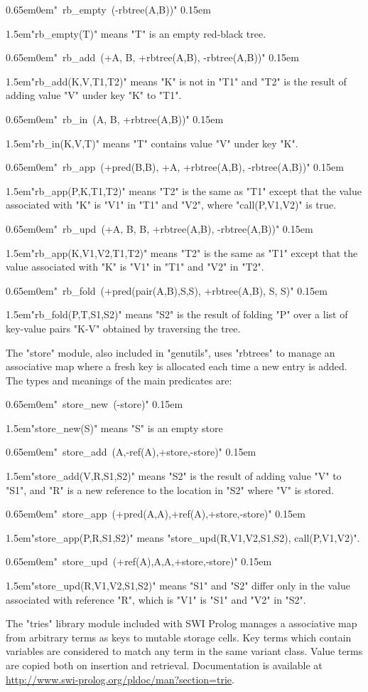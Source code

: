 {\parindent 0pt
\def\dt{\parskip 0.65em\leftskip 0em}
\def\dd{\parskip 0.15em \par\leftskip 1.5em}

  \dt "~rb_empty~(-rbtree(A,B))" 
  \dd "rb_empty(T)" means "T" is an empty red-black tree.

  \dt "~rb_add~(+A, B, +rbtree(A,B), -rbtree(A,B))"
  \dd "rb_add(K,V,T1,T2)" means "K" is not in "T1" and "T2"  is the result of
      adding value "V" under key "K" to "T1".

  \dt "~rb_in~(A, B, +rbtree(A,B))"
  \dd "rb_in(K,V,T)" means "T" contains value "V" under key "K".

  \dt "~rb_app~(+pred(B,B), +A, +rbtree(A,B), -rbtree(A,B))"
  \dd "rb_app(P,K,T1,T2)" means "T2" is the same as "T1" except that the value
      associated with "K" is "V1" in "T1" and "V2", where "call(P,V1,V2)" is true.

  \dt "~rb_upd~(+A, B, B, +rbtree(A,B), -rbtree(A,B))"
  \dd "rb_app(K,V1,V2,T1,T2)" means "T2" is the same as "T1" except that the
      value associated with "K" is "V1" in "T1" and "V2" in "T2".

  \dt "~rb_fold~(+pred(pair(A,B),S,S), +rbtree(A,B), S, S)"
  \dd "rb_fold(P,T,S1,S2)" means "S2" is the result of folding "P" over a list of key-value
      pairs "K-V" obtained by traversing the tree.

}
\vspace{0.5em}
\noindent
The "store" module, also included in "genutils", uses "rbtrees" to manage an associative map where 
a fresh key is allocated each time a new entry is added. The types and meanings of the main predicates
are:
{\parindent 0pt
\def\dt{\parskip 0.65em\leftskip 0em}
\def\dd{\parskip 0.15em \par\leftskip 1.5em}

  \dt "~store_new~(-store)" 
  \dd {"store_new(S)"} means {"S"} is an empty store

  \dt "~store_add~(A,-ref(A),+store,-store)" 
  \dd "store_add(V,R,S1,S2)" means "S2" is the result of adding value "V" to "S1", and "R" is a new
  reference to the location in "S2" where "V" is stored.

  \dt "~store_app~(+pred(A,A),+ref(A),+store,-store)"
  \dd "store_app(P,R,S1,S2)" means "store_upd(R,V1,V2,S1,S2), call(P,V1,V2)".

  \dt "~store_upd~(+ref(A),A,A,+store,-store)"
  \dd "store_upd(R,V1,V2,S1,S2)" means "S1" and "S2" differ only in the value associated with reference "R",
  which is "V1" is "S1" and "V2" in "S2".

}
\vspace{0.5em}
\noindent
The "tries" library module included with SWI Prolog manages a associative map from arbitrary
terms as keys to mutable storage cells. Key terms which contain variables are considered
to match any term in the same variant class. Value terms are copied both on insertion and
retrieval. Documentation is available at \url{http://www.swi-prolog.org/pldoc/man?section=trie}.

